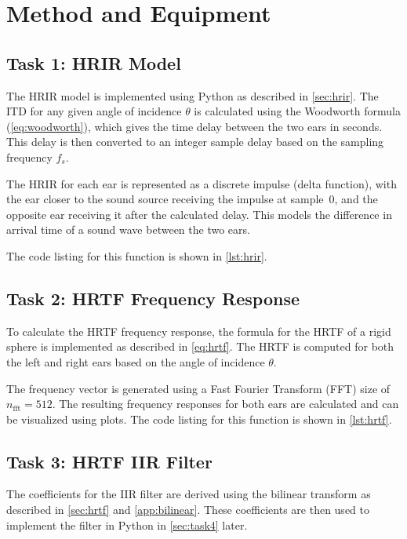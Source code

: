 \chapter{Method and Equipment}
\label{ch:method_equipment}

\section{Task 1: HRIR Model}
\label{sec:task1}

The HRIR model is implemented using Python as described in \autoref{sec:hrir}. The ITD for any given angle of incidence \( \theta \) is calculated using the Woodworth formula (\autoref{eq:woodworth}), which gives the time delay between the two ears in seconds. This delay is then converted to an integer sample delay based on the sampling frequency \( f_s \).

The HRIR for each ear is represented as a discrete impulse (delta function), with the ear closer to the sound source receiving the impulse at sample~0, and the opposite ear receiving it after the calculated delay. This models the difference in arrival time of a sound wave between the two ears.

The code listing for this function is shown in \autoref{lst:hrir}.

\section{Task 2: HRTF Frequency Response}
\label{sec:task2}

To calculate the HRTF frequency response, the formula for the HRTF of a rigid sphere is implemented as described in \autoref{eq:hrtf}. The HRTF is computed for both the left and right ears based on the angle of incidence \( \theta \).

The frequency vector is generated using a Fast Fourier Transform (FFT) size of \( n_{\text{fft}} = 512 \). The resulting frequency responses for both ears are calculated and can be visualized using plots. The code listing for this function is shown in \autoref{lst:hrtf}.

\section{Task 3: HRTF IIR Filter}
\label{sec:task3}

The coefficients for the IIR filter are derived using the bilinear transform as described in \autoref{sec:hrtf} and \autoref{app:bilinear}. These coefficients are then used to implement the filter in Python in \autoref{sec:task4} later.

